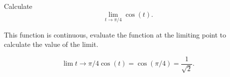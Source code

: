\documentclass{ximera}
\author{Emma Smith Zbarsky}
\begin{document}
\begin{exercise}

Calculate \[\lim_{t\to \pi/4} \cos(t).\]


\begin{hint}
This function is continuous, evaluate the function at the limiting point
to calculate the value of the limit.
\end{hint}


\begin{hint}
\[\lim{t\to \pi/4}\cos(t) = \cos(\pi/4) = \frac{1}{\sqrt{2}}.\]
\end{hint}


\begin{multipleChoice}
\choice{$\infty$}
\end{multipleChoice}

\end{exercise}
\end{document}
